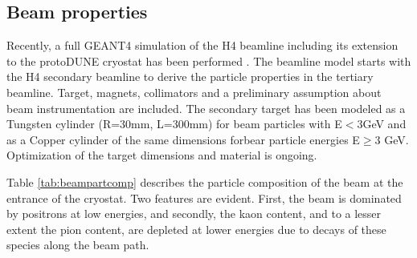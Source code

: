 \subsection{Beam properties}
Recently, a full GEANT4 simulation of the H4 beamline including its extension to the protoDUNE cryostat has been performed \cite{H4beamfiles}. 
The beamline model starts with the H4 secondary beamline 
to derive the particle properties in the tertiary beamline.  Target, magnets, collimators and a preliminary assumption
about beam instrumentation are included. The secondary target has been
modeled as a Tungsten cylinder (R=30mm, L=300mm) for beam particles with E$<3$GeV and as a Copper cylinder of the same dimensions  forbear particle energies  E$\geqslant$3 GeV. Optimization of the target dimensions and material is ongoing.

Table \ref{tab:beampartcomp} describes the particle composition of the
beam at the entrance of the cryostat. Two features are evident. First, the beam is dominated by positrons at low energies,
and secondly, the kaon content, and to a lesser extent the pion content, are depleted at lower energies due to decays of these species 
along the beam path. 

